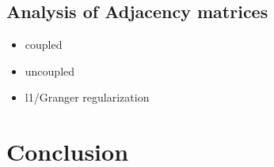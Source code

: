 \documentclass{article}
\begin{document}
\subsection{Analysis of Adjacency matrices}
\label{sec:org93940cb}
\begin{itemize}
\item coupled
\item uncoupled
\item l1/Granger regularization
\end{itemize}

\section{Conclusion}
\label{sec:org62d2636}

\printbibliography
\end{document}
